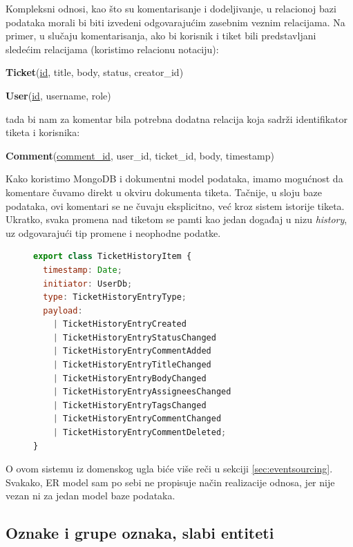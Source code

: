 \documentclass[12pt,oneside]{memoir}
\begin{document}
Kompleksni odnosi, kao što su komentarisanje i dodeljivanje, u relacionoj bazi podataka morali bi biti izvedeni odgovarajućim zasebnim veznim relacijama. Na primer, u slučaju komentarisanja, ako bi korisnik i tiket bili predstavljani sledećim relacijama (koristimo relacionu notaciju):

\begin{center}
\textbf{Ticket}(\underline{id}, title, body, status, creator\_id)    
\end{center}

\begin{center}
\textbf{User}(\underline{id}, username, role)    
\end{center}

tada bi nam za komentar bila potrebna dodatna relacija koja sadrži identifikator tiketa i korisnika:

\begin{center}
\textbf{Comment}(\underline{comment\_id}, user\_id, ticket\_id, body, timestamp)    
\end{center}

Kako koristimo MongoDB i dokumentni model podataka, imamo mogućnost da komentare čuvamo direkt u okviru dokumenta tiketa. Tačnije, u sloju baze podataka, ovi komentari se ne čuvaju eksplicitno, već kroz sistem istorije tiketa. Ukratko, svaka promena nad tiketom se pamti kao jedan događaj u nizu \textit{history}, uz odgovarajući tip promene i neophodne podatke.

\begin{figure}[h]
\begin{lstlisting}[language=JavaScript, style=ES6, caption={Tip podataka istorije tiketa}]
export class TicketHistoryItem {
  timestamp: Date;
  initiator: UserDb;
  type: TicketHistoryEntryType;
  payload:
    | TicketHistoryEntryCreated
    | TicketHistoryEntryStatusChanged
    | TicketHistoryEntryCommentAdded
    | TicketHistoryEntryTitleChanged
    | TicketHistoryEntryBodyChanged
    | TicketHistoryEntryAssigneesChanged
    | TicketHistoryEntryTagsChanged
    | TicketHistoryEntryCommentChanged
    | TicketHistoryEntryCommentDeleted;
}
\end{lstlisting}
\end{figure}

O ovom sistemu iz domenskog ugla biće više reči u sekciji \ref{sec:eventsourcing}. Svakako, ER model sam po sebi ne propisuje način realizacije odnosa, jer nije vezan ni za jedan model baze podataka.

\subsection{Oznake i grupe oznaka, slabi entiteti}
\end{document}
